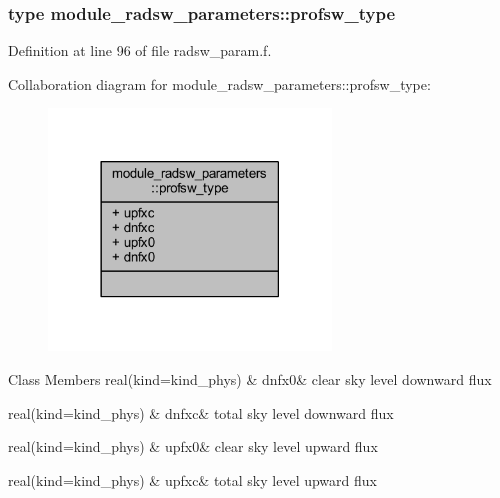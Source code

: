 \label{structmodule__radsw__parameters_1_1profsw__type}
\hypertarget{namespacemodule__radsw__parameters_structmodule__radsw__parameters_1_1profsw__type}{}
\subsubsection{type module\+\_\+radsw\+\_\+parameters\+:\+:profsw\+\_\+type}


Definition at line 96 of file radsw\+\_\+param.\+f.



Collaboration diagram for module\+\_\+radsw\+\_\+parameters\+:\+:profsw\+\_\+type\+:\nopagebreak
\begin{figure}[H]
\begin{center}
\leavevmode
\includegraphics[width=213pt]{structmodule__radsw__parameters_1_1profsw__type__coll__graph}
\end{center}
\end{figure}
\begin{DoxyFields}{Class Members}
real(kind=kind\+\_\+phys)\hypertarget{namespacemodule__radsw__parameters_aff3ff3155ed05a18fa7caba351d1c503}{}\label{namespacemodule__radsw__parameters_aff3ff3155ed05a18fa7caba351d1c503}
&
dnfx0&
clear sky level downward flux \\
\hline

real(kind=kind\+\_\+phys)\hypertarget{namespacemodule__radsw__parameters_a4d253ac17ae97351a0a3eb15ab4d55e4}{}\label{namespacemodule__radsw__parameters_a4d253ac17ae97351a0a3eb15ab4d55e4}
&
dnfxc&
total sky level downward flux \\
\hline

real(kind=kind\+\_\+phys)\hypertarget{namespacemodule__radsw__parameters_aa9205ed3a95d61dd8e4e7184fd6da43e}{}\label{namespacemodule__radsw__parameters_aa9205ed3a95d61dd8e4e7184fd6da43e}
&
upfx0&
clear sky level upward flux \\
\hline

real(kind=kind\+\_\+phys)\hypertarget{namespacemodule__radsw__parameters_a5122ef2eef4e86a7aadf77114da4b3e2}{}\label{namespacemodule__radsw__parameters_a5122ef2eef4e86a7aadf77114da4b3e2}
&
upfxc&
total sky level upward flux \\
\hline

\end{DoxyFields}
\label{structmodule__radsw__parameters_1_1sfcfsw__type}
\hypertarget{namespacemodule__radsw__parameters_structmodule__radsw__parameters_1_1sfcfsw__type}{}
